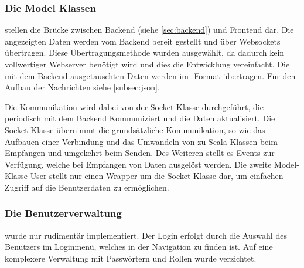 \FloatBarrier
\subsubsection*{Die Model Klassen}
stellen die Brücke zwischen Backend (siehe \autoref{sec:backend}) und Frontend dar. Die angezeigten Daten werden vom Backend bereit gestellt und über Websockets übertragen. Diese Übertragungsmethode wurden ausgewählt, da dadurch kein vollwertiger Webserver benötigt wird und dies die Entwicklung vereinfacht. Die mit dem Backend ausgetauschten Daten werden im \JSON-Format übertragen. Für den Aufbau der Nachrichten siehe \autoref{subsec:json}. 

Die Kommunikation wird dabei von der Socket-Klasse durchgeführt, die periodisch mit dem Backend Kommuniziert und die Daten aktualisiert.
Die Socket-Klasse übernimmt die grundsätzliche Kommunikation, so wie das Aufbauen einer Verbindung und das Umwandeln von \JSON zu Scala-Klassen beim Empfangen und umgekehrt beim Senden. Des Weiteren stellt es Events zur Verfügung, welche bei Empfangen von Daten ausgelöst werden.
Die zweite Model-Klasse User stellt nur einen Wrapper um die Socket Klasse dar, um einfachen Zugriff auf die Benutzerdaten zu ermöglichen.

\FloatBarrier
\subsubsection*{Die Benutzerverwaltung}
wurde nur rudimentär implementiert. Der Login erfolgt durch die Auswahl des Benutzers im Loginmenü, welches in der Navigation zu finden ist. Auf eine komplexere Verwaltung mit Passwörtern und Rollen wurde verzichtet.